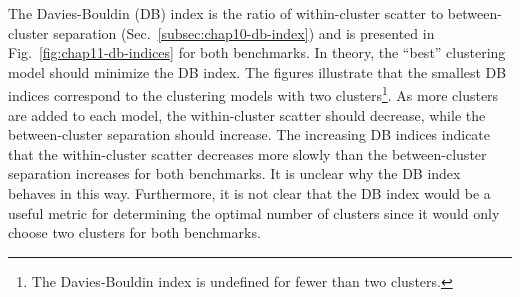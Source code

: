 The Davies-Bouldin (DB) index is the ratio of within-cluster scatter to between-cluster separation (Sec.~\ref{subsec:chap10-db-index}) and is presented in Fig.~\ref{fig:chap11-db-indices} for both benchmarks. In theory, the ``best'' clustering model should minimize the DB index. The figures illustrate that the smallest DB indices correspond to the clustering models with two clusters\footnote{The Davies-Bouldin index is undefined for fewer than two clusters.}. As more clusters are added to each model, the within-cluster scatter should decrease, while the between-cluster separation should increase. The increasing DB indices indicate that the within-cluster scatter decreases more slowly than the between-cluster separation increases for both benchmarks. It is unclear why the DB index behaves in this way. Furthermore, it is not clear that the DB index would be a useful metric for determining the optimal number of clusters since it would only choose two clusters for both benchmarks.

